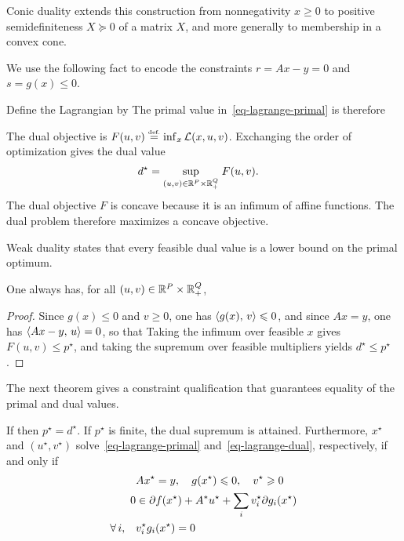Conic duality extends this construction from nonnegativity $x \geq 0$ to positive semidefiniteness $X \succeq 0$ of a matrix $X$, and more generally to membership in a convex cone.

We use the following fact
to encode the constraints $r=Ax-y=0$ and $s=g(x) \leq 0$.

Define the Lagrangian by
The primal value in~\eqref{eq-lagrange-primal} is therefore

The dual objective is $F(u,v)\stackrel{\mbox{\upshape\tiny def.}}{=}\inf_x\mathcal{L}(x,u,v)$. Exchanging the order of optimization gives the dual value
\begin{align}\label{eq-lagrange-dual}
	d^\star &= \underset{(u,v) \in \mathbb{R}^P \times \mathbb{R}_+^Q }{\sup}\; F(u,v).
\end{align}
The dual objective $F$ is concave because it is an infimum of affine functions. The dual problem therefore maximizes a concave objective.


Weak duality states that every feasible dual value is a lower bound on the primal optimum.

\begin{prop}
	One always has, for all $(u,v) \in \mathbb{R}^P \times \mathbb{R}_+^Q$, %
\end{prop}
\begin{proof}
	Since $g(x) \leq 0 $ and $v \geq 0$, one has $\langle g(x),\,v\rangle \leqslant 0$, and since $Ax=y$, one has $\langle Ax-y,\,u\rangle=0$, so that 
	Taking the infimum over feasible $x$ gives $F(u,v)\leq p^\star$, and taking the supremum over feasible multipliers yields $d^\star\leq p^\star$.
\end{proof}

The next theorem gives a constraint qualification that guarantees equality of the primal and dual values.

\begin{thm}\label{thm-strong-duality}
	If 
	then $p^\star=d^\star$. If $p^\star$ is finite, the dual supremum is attained. Furthermore, $x^\star$ and $(u^\star,v^\star)$ solve~\eqref{eq-lagrange-primal} and~\eqref{eq-lagrange-dual}, respectively, if and only if
	\begin{align}
		\label{eq-lagr-dual-1}  & Ax^\star=y, \quad g(x^\star) \leqslant 0, \quad v^\star \geqslant 0 \\
		\label{eq-lagr-dual-2} 0 &\in \partial f(x^\star) + A^*u^\star + \sum_i v_i^\star \partial g_i(x^\star) \\
		\label{eq-lagr-dual-3}  \forall \, i, \quad & v_i^\star g_i(x^\star) = 0
	\end{align}
\end{thm}

